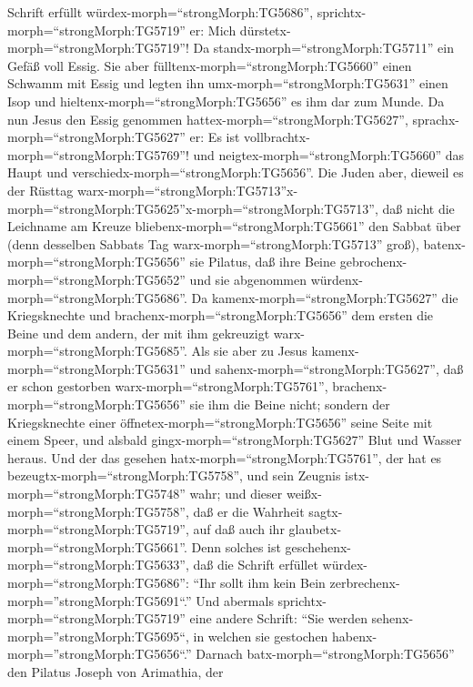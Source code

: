 Schrift erfüllt würdex-morph=``strongMorph:TG5686'',
sprichtx-morph=``strongMorph:TG5719'' er: Mich
dürstetx-morph=``strongMorph:TG5719''!  Da
standx-morph=``strongMorph:TG5711'' ein Gefäß voll Essig. Sie aber
fülltenx-morph=``strongMorph:TG5660'' einen Schwamm mit Essig und legten
ihn umx-morph=``strongMorph:TG5631'' einen Isop und
hieltenx-morph=``strongMorph:TG5656'' es ihm dar zum Munde.
 Da nun Jesus den Essig genommen
hattex-morph=``strongMorph:TG5627'',
sprachx-morph=``strongMorph:TG5627'' er: Es ist
vollbrachtx-morph=``strongMorph:TG5769''! und
neigtex-morph=``strongMorph:TG5660'' das Haupt und
verschiedx-morph=``strongMorph:TG5656''.  Die Juden aber,
dieweil es der Rüsttag
warx-morph=``strongMorph:TG5713''\textbar x-morph=``strongMorph:TG5625''x-morph=``strongMorph:TG5713'',
daß nicht die Leichname am Kreuze bliebenx-morph=``strongMorph:TG5661''
den Sabbat über (denn desselben Sabbats Tag
warx-morph=``strongMorph:TG5713'' groß),
batenx-morph=``strongMorph:TG5656'' sie Pilatus, daß ihre Beine
gebrochenx-morph=``strongMorph:TG5652'' und sie abgenommen
würdenx-morph=``strongMorph:TG5686''.  Da
kamenx-morph=``strongMorph:TG5627'' die Kriegsknechte und
brachenx-morph=``strongMorph:TG5656'' dem ersten die Beine und dem
andern, der mit ihm gekreuzigt warx-morph=``strongMorph:TG5685''.
 Als sie aber zu Jesus kamenx-morph=``strongMorph:TG5631''
und sahenx-morph=``strongMorph:TG5627'', daß er schon gestorben
warx-morph=``strongMorph:TG5761'', brachenx-morph=``strongMorph:TG5656''
sie ihm die Beine nicht;  sondern der Kriegsknechte einer
öffnetex-morph=``strongMorph:TG5656'' seine Seite mit einem Speer, und
alsbald gingx-morph=``strongMorph:TG5627'' Blut und Wasser heraus.
 Und der das gesehen hatx-morph=``strongMorph:TG5761'', der
hat es bezeugtx-morph=``strongMorph:TG5758'', und sein Zeugnis
istx-morph=``strongMorph:TG5748'' wahr; und dieser
weißx-morph=``strongMorph:TG5758'', daß er die Wahrheit
sagtx-morph=``strongMorph:TG5719'', auf daß auch ihr
glaubetx-morph=``strongMorph:TG5661''.  Denn solches ist
geschehenx-morph=``strongMorph:TG5633'', daß die Schrift erfüllet
würdex-morph=``strongMorph:TG5686'': ``Ihr sollt ihm kein Bein
zerbrechenx-morph=''strongMorph:TG5691``.''  Und abermals
sprichtx-morph=``strongMorph:TG5719'' eine andere Schrift: ``Sie werden
sehenx-morph=''strongMorph:TG5695``, in welchen sie gestochen
habenx-morph=''strongMorph:TG5656``.''  Darnach
batx-morph=``strongMorph:TG5656'' den Pilatus Joseph von Arimathia, der
